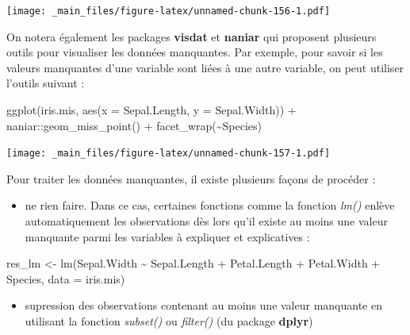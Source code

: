 \documentclass[
]{book}
\newenvironment{Shaded}{\begin{snugshade}}{\end{snugshade}}
\newcommand{\AttributeTok}[1]{\textcolor[rgb]{0.77,0.63,0.00}{#1}}
\newcommand{\FunctionTok}[1]{\textcolor[rgb]{0.00,0.00,0.00}{#1}}
\newcommand{\NormalTok}[1]{#1}
\newcommand{\OtherTok}[1]{\textcolor[rgb]{0.56,0.35,0.01}{#1}}
\newcommand{\SpecialCharTok}[1]{\textcolor[rgb]{0.00,0.00,0.00}{#1}}
\providecommand{\tightlist}{%
  \setlength{\itemsep}{0pt}\setlength{\parskip}{0pt}}
\theoremstyle{definition}
\theoremstyle{definition}
\theoremstyle{definition}
\theoremstyle{definition}
\theoremstyle{remark}
\begin{document}
\texttt{[image: \_main\_files/figure-latex/unnamed-chunk-156-1.pdf]}

On notera également les packages \textbf{visdat} et \textbf{naniar} qui proposent plusieurs outils pour visualiser les données manquantes. Par exemple, pour savoir si les valeurs manquantes d'une variable sont liées à une autre variable, on peut utiliser l'outils suivant :

\begin{Shaded}
\begin{Highlighting}[]
\FunctionTok{ggplot}\NormalTok{(iris.mis, }\FunctionTok{aes}\NormalTok{(}\AttributeTok{x =}\NormalTok{ Sepal.Length, }\AttributeTok{y =}\NormalTok{ Sepal.Width)) }\SpecialCharTok{+} 
\NormalTok{  naniar}\SpecialCharTok{::}\FunctionTok{geom\_miss\_point}\NormalTok{() }\SpecialCharTok{+} 
  \FunctionTok{facet\_wrap}\NormalTok{(}\SpecialCharTok{\textasciitilde{}}\NormalTok{Species)}
\end{Highlighting}
\end{Shaded}

\texttt{[image: \_main\_files/figure-latex/unnamed-chunk-157-1.pdf]}

Pour traiter les données manquantes, il existe plusieurs façons de procéder :

\begin{itemize}
\tightlist
\item
  ne rien faire. Dans ce cas, certaines fonctions comme la fonction \emph{lm()} enlève automatiquement les observations dès lors qu'il existe au moins une valeur manquante parmi les variables à expliquer et explicatives :
\end{itemize}

\begin{Shaded}
\begin{Highlighting}[]
\NormalTok{res\_lm }\OtherTok{\textless{}{-}} \FunctionTok{lm}\NormalTok{(Sepal.Width }\SpecialCharTok{\textasciitilde{}}\NormalTok{ Sepal.Length }\SpecialCharTok{+}\NormalTok{ Petal.Length }\SpecialCharTok{+} 
\NormalTok{             Petal.Width }\SpecialCharTok{+}\NormalTok{ Species, }\AttributeTok{data =}\NormalTok{ iris.mis)}
\end{Highlighting}
\end{Shaded}

\begin{itemize}
\tightlist
\item
  supression des observations contenant au moins une valeur manquante en utilisant la fonction \emph{subset()} ou \emph{filter()} (du package \textbf{dplyr})
\end{itemize}
\end{document}
